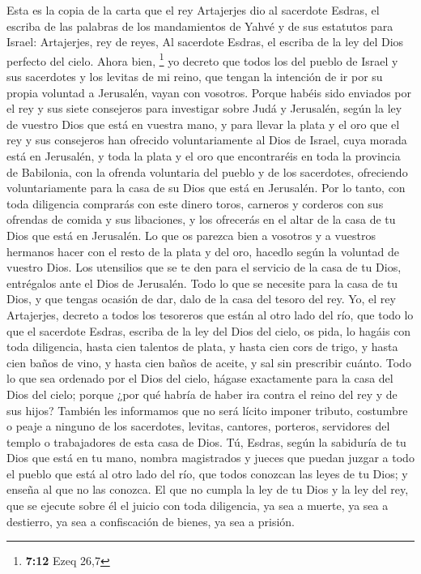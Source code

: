  Esta es la copia de la carta que el rey Artajerjes dio
al sacerdote Esdras, el escriba de las palabras de los mandamientos de
Yahvé y de sus estatutos para Israel:  Artajerjes, rey de
reyes, Al sacerdote Esdras, el escriba de la ley del Dios perfecto del
cielo. Ahora bien, \footnote{\textbf{7:12} Ezeq 26,7}  yo
decreto que todos los del pueblo de Israel y sus sacerdotes y los
levitas de mi reino, que tengan la intención de ir por su propia
voluntad a Jerusalén, vayan con vosotros.  Porque habéis
sido enviados por el rey y sus siete consejeros para investigar sobre
Judá y Jerusalén, según la ley de vuestro Dios que está en vuestra mano,
 y para llevar la plata y el oro que el rey y sus
consejeros han ofrecido voluntariamente al Dios de Israel, cuya morada
está en Jerusalén,  y toda la plata y el oro que
encontraréis en toda la provincia de Babilonia, con la ofrenda
voluntaria del pueblo y de los sacerdotes, ofreciendo voluntariamente
para la casa de su Dios que está en Jerusalén.  Por lo
tanto, con toda diligencia comprarás con este dinero toros, carneros y
corderos con sus ofrendas de comida y sus libaciones, y los ofrecerás en
el altar de la casa de tu Dios que está en Jerusalén.  Lo
que os parezca bien a vosotros y a vuestros hermanos hacer con el resto
de la plata y del oro, hacedlo según la voluntad de vuestro Dios.
 Los utensilios que se te den para el servicio de la casa
de tu Dios, entrégalos ante el Dios de Jerusalén.  Todo
lo que se necesite para la casa de tu Dios, y que tengas ocasión de dar,
dalo de la casa del tesoro del rey.  Yo, el rey
Artajerjes, decreto a todos los tesoreros que están al otro lado del
río, que todo lo que el sacerdote Esdras, escriba de la ley del Dios del
cielo, os pida, lo hagáis con toda diligencia,  hasta
cien talentos de plata, y hasta cien cors de trigo, y hasta cien baños
de vino, y hasta cien baños de aceite, y sal sin prescribir cuánto.
 Todo lo que sea ordenado por el Dios del cielo, hágase
exactamente para la casa del Dios del cielo; porque ¿por qué habría de
haber ira contra el reino del rey y de sus hijos? 
También les informamos que no será lícito imponer tributo, costumbre o
peaje a ninguno de los sacerdotes, levitas, cantores, porteros,
servidores del templo o trabajadores de esta casa de Dios.
 Tú, Esdras, según la sabiduría de tu Dios que está en tu
mano, nombra magistrados y jueces que puedan juzgar a todo el pueblo que
está al otro lado del río, que todos conozcan las leyes de tu Dios; y
enseña al que no las conozca.  El que no cumpla la ley de
tu Dios y la ley del rey, que se ejecute sobre él el juicio con toda
diligencia, ya sea a muerte, ya sea a destierro, ya sea a confiscación
de bienes, ya sea a prisión.

